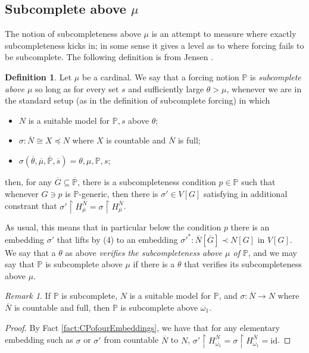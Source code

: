 \documentclass{amsart}
\theoremstyle{definition}
\newtheorem{definition}[theorem]{Definition}
\theoremstyle{remark}
\newtheorem{remark}[theorem]{Remark}
\renewcommand{\P}{\mathbb{P}}
\newcommand{\N}{{\overline{N}}}
\newcommand{\G}{\overline{G}}
\newcommand{\To}{\longrightarrow}
\newcommand{\rest}{\mathbin{\upharpoonright}}
\begin{document}
\subsection{Subcomplete above $\mu$} \label{subsec:subcompleteabovemu}
The notion of subcompleteness above $\mu$ is an attempt to measure where exactly subcompleteness kicks in; in some sense it gives a level as to where forcing fails to be subcomplete. 
The following definition is from Jensen \cite[Chapter 2 p.\ 47]{Jensen:2009fe}.
\begin{definition} 
Let $\mu$ be a cardinal. We say that a forcing notion $\P$ is \emph{subcomplete above $\mu$} so long as for every set $s$ and sufficiently large $\theta > \mu$, whenever we are in the standard setup (as in the definition of subcomplete forcing) in which \begin{itemize}
	\item $N$ is a suitable model for $\P, s$ above $\theta$;
	\item $\sigma:\N \cong X \preccurlyeq N$ where $X$ is countable and $\N$ is full;
	\item $\sigma(\overline{\theta}, \overline{\mu}, \overline{\P}, \overline s)=\theta, \mu, \P, s$;
\end{itemize}	
then, for any $\G \subseteq \overline{\P}$, there is a subcompleteness condition $p \in \P$ such that whenever $G \ni p$ is $\P$-generic, then there is $\sigma' \in V[G]$ satisfying in additional constrant that $\sigma' \rest H_{\overline \mu}^{\N} = \sigma \rest H_{\overline \mu}^{\N}$.

As usual, this means that in particular below the condition $p$ there is an embedding $\sigma'$ that lifts by (4) to an embedding $\sigma'^*:\N[\G] \prec N[G]$ in $V[G]$. We say that a $\theta$ as above \textit{verifies the subcompleteness above $\mu$ of $\P$}, and we may say that $\P$ is subcomplete above \(\mu\) if there is a $\theta$ that verifies its subcompleteness above $\mu$.
\end{definition}

\begin{remark} If $\P$ is subcomplete, $N$ is a suitable model for $\P$, and $\sigma:\N \To N$ where $\N$ is countable and full, then $\P$ is subcomplete above $\omega_1$. \end{remark}
\begin{proof} By Fact \ref{fact:CPofourEmbeddings}, we have that for any elementary embedding such as $\sigma$ or $\sigma'$ from countable $\N$ to $N$, $\sigma' \rest H_{\overline{\omega_1}}^{\N} = \sigma \rest H_{\overline{\omega_1}}^{\N} = \text{id}$. \end{proof}
\end{document}
